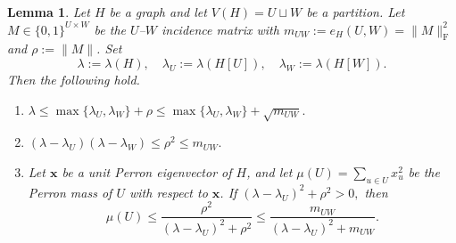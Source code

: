 \documentclass[11pt]{article}
\newtheorem{lemma}[theorem]{Lemma}
\theoremstyle{definition}
\theoremstyle{plain}
\begin{document}
\begin{lemma}
\label{lem:spectral-vertex-cut}
Let \(H\) be a graph and let \(V(H)=U\sqcup W\) be a partition.
Let \(M\in\{0,1\}^{U\times W}\) be the \(U\)--\(W\) incidence matrix with $ m_{UW}:=e_H(U,W)=\|M\|_{\mathrm F}^2$ and  
$\rho:=\|M\|$. Set
\[ \lambda:=\lambda(H),
        \quad
        \lambda_U:=\lambda(H[U]),
        \quad
        \lambda_W:=\lambda(H[W]).
\]
Then the following hold.
\begin{enumerate}
  \item[\rm(a)] $\lambda
        \le
        \max\{\lambda_U,\lambda_W\}+\rho
        \le
        \max\{\lambda_U,\lambda_W\}+\sqrt{m_{UW}}.$

  \item[\rm(b)]
        $(\lambda-\lambda_U)(\lambda-\lambda_W)
        \le
        \rho^2
        \le
        m_{UW}.$

  \item[\rm(c)]
  Let \(\bm{x}\) be a unit Perron eigenvector of \(H\), and let
  \(\mu(U)=\sum_{u\in U}x_u^2\) be the Perron mass of \(U\) with respect
  to \(\bm{x}\).  If $(\lambda-\lambda_U)^2+\rho^2>0,$
  then
  \[
        \mu(U)
        \le
        \frac{\rho^2}{(\lambda-\lambda_U)^2+\rho^2}
        \le
        \frac{m_{UW}}{(\lambda-\lambda_U)^2+m_{UW}}.
  \]
\end{enumerate}
\end{lemma}
\end{document}
